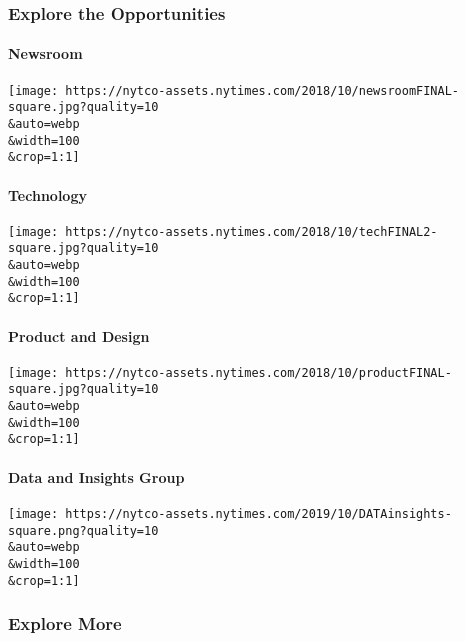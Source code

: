 \hypertarget{explore-the-opportunities}{%
\subsubsection{Explore the
Opportunities}\label{explore-the-opportunities}}

\href{https://www.nytco.com/careers/newsroom/}{}

\hypertarget{newsroom}{%
\paragraph{Newsroom}\label{newsroom}}

\texttt{[image: https://nytco-assets.nytimes.com/2018/10/newsroomFINAL-square.jpg?quality=10\\\&auto=webp\\\&width=100\\\&crop=1:1]}

\href{https://www.nytco.com/careers/technology/}{}

\hypertarget{technology}{%
\paragraph{Technology}\label{technology}}

\texttt{[image: https://nytco-assets.nytimes.com/2018/10/techFINAL2-square.jpg?quality=10\\\&auto=webp\\\&width=100\\\&crop=1:1]}

\href{https://www.nytco.com/careers/product-and-design/}{}

\hypertarget{product-and-design}{%
\paragraph{Product and Design}\label{product-and-design}}

\texttt{[image: https://nytco-assets.nytimes.com/2018/10/productFINAL-square.jpg?quality=10\\\&auto=webp\\\&width=100\\\&crop=1:1]}

\href{https://www.nytco.com/careers/data-and-insights-group/}{}

\hypertarget{data-and-insights-group}{%
\paragraph{Data and Insights Group}\label{data-and-insights-group}}

\texttt{[image: https://nytco-assets.nytimes.com/2019/10/DATAinsights-square.png?quality=10\\\&auto=webp\\\&width=100\\\&crop=1:1]}

\hypertarget{explore-more}{%
\subsubsection{Explore More}\label{explore-more}}

